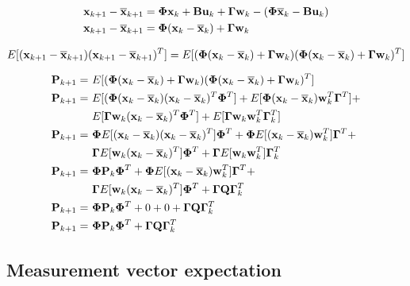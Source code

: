 \begin{align*}
  \mathbf{x}_{k+1} - \overline{\mathbf{x}}_{k+1} &= \mathbf{\Phi}\mathbf{x}_k +
    \mathbf{B}\mathbf{u}_k + \mathbf{\Gamma}\mathbf{w}_k - (\mathbf{\Phi}\overline{\mathbf{x}}_k -
    \mathbf{B}\mathbf{u}_k) \\
  \mathbf{x}_{k+1} - \overline{\mathbf{x}}_{k+1} &=
    \mathbf{\Phi}(\mathbf{x}_k - \overline{\mathbf{x}}_k) + \mathbf{\Gamma}\mathbf{w}_k
\end{align*}

\begin{equation*}
  E[(\mathbf{x}_{k+1} - \overline{\mathbf{x}}_{k+1})(\mathbf{x}_{k+1} - \overline{\mathbf{x}}_{k+1})^T] =
    E[(\mathbf{\Phi}(\mathbf{x}_k - \overline{\mathbf{x}}_k) + \mathbf{\Gamma}\mathbf{w}_k)
      (\mathbf{\Phi}(\mathbf{x}_k - \overline{\mathbf{x}}_k) + \mathbf{\Gamma}\mathbf{w}_k)^T]
\end{equation*}

\begin{align*}
  \mathbf{P}_{k+1} =~&
    E[(\mathbf{\Phi}(\mathbf{x}_k - \overline{\mathbf{x}}_k) + \mathbf{\Gamma}\mathbf{w}_k)
      (\mathbf{\Phi}(\mathbf{x}_k - \overline{\mathbf{x}}_k) + \mathbf{\Gamma}\mathbf{w}_k)^T] \\
  \mathbf{P}_{k+1} =~&
    E[(\mathbf{\Phi}(\mathbf{x}_k - \overline{\mathbf{x}}_k)(\mathbf{x}_k - \overline{\mathbf{x}}_k)^T
      \mathbf{\Phi}^T] +
    E[\mathbf{\Phi}(\mathbf{x}_k - \overline{\mathbf{x}}_k)\mathbf{w}_k^T\mathbf{\Gamma}^T] + \\
    &E[\mathbf{\Gamma}\mathbf{w}_k(\mathbf{x}_k - \overline{\mathbf{x}}_k)^T\mathbf{\Phi}^T] +
    E[\mathbf{\Gamma}\mathbf{w}_k\mathbf{w}_k^T\mathbf{\Gamma}_k^T] \\
  \mathbf{P}_{k+1} =~&
    \mathbf{\Phi}E[(\mathbf{x}_k - \overline{\mathbf{x}}_k)(\mathbf{x}_k - \overline{\mathbf{x}}_k)^T]
    \mathbf{\Phi}^T +
    \mathbf{\Phi}E[(\mathbf{x}_k - \overline{\mathbf{x}}_k)\mathbf{w}_k^T]\mathbf{\Gamma}^T + \\
    &\mathbf{\Gamma} E[\mathbf{w}_k(\mathbf{x}_k - \overline{\mathbf{x}}_k)^T]\mathbf{\Phi}^T +
    \mathbf{\Gamma} E[\mathbf{w}_k\mathbf{w}_k^T]\mathbf{\Gamma}_k^T \\
  \mathbf{P}_{k+1} =~& \mathbf{\Phi}\mathbf{P}_k\mathbf{\Phi}^T +
    \mathbf{\Phi}E[(\mathbf{x}_k - \overline{\mathbf{x}}_k)\mathbf{w}_k^T]\mathbf{\Gamma}^T + \\
    &\mathbf{\Gamma} E[\mathbf{w}_k(\mathbf{x}_k - \overline{\mathbf{x}}_k)^T]\mathbf{\Phi}^T +
    \mathbf{\Gamma}\mathbf{Q}\mathbf{\Gamma}_k^T \\
  \mathbf{P}_{k+1} =~& \mathbf{\Phi}\mathbf{P}_k\mathbf{\Phi}^T + 0 + 0 +
    \mathbf{\Gamma}\mathbf{Q}\mathbf{\Gamma}_k^T \\
  \mathbf{P}_{k+1} =~& \mathbf{\Phi}\mathbf{P}_k\mathbf{\Phi}^T +
    \mathbf{\Gamma}\mathbf{Q}\mathbf{\Gamma}_k^T
\end{align*}

\subsection{Measurement vector expectation}


